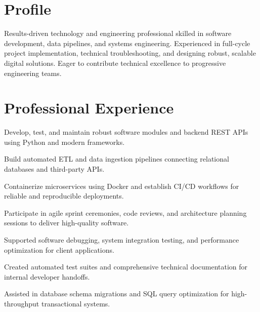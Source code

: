 \documentclass[10pt,a4paper]{article}
\begin{document}

\section*{Profile}
Results-driven technology and engineering professional skilled in software development, data pipelines, and systems engineering. Experienced in full-cycle project implementation, technical troubleshooting, and designing robust, scalable digital solutions. Eager to contribute technical excellence to progressive engineering teams.

\section*{Professional Experience}

\begin{cvitems}

  \item Develop, test, and maintain robust software modules and backend REST APIs using Python and modern frameworks.

  \item Build automated ETL and data ingestion pipelines connecting relational databases and third-party APIs.

  \item Containerize microservices using Docker and establish CI/CD workflows for reliable and reproducible deployments.

  \item Participate in agile sprint ceremonies, code reviews, and architecture planning sessions to deliver high-quality software.

\end{cvitems}
\vspace{2pt}

\begin{cvitems}

  \item Supported software debugging, system integration testing, and performance optimization for client applications.

  \item Created automated test suites and comprehensive technical documentation for internal developer handoffs.

  \item Assisted in database schema migrations and SQL query optimization for high-throughput transactional systems.

\end{cvitems}
\vspace{2pt}
\end{document}
